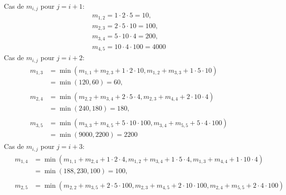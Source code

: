 {\begin{td-sol}[]
\begin{enumerate}
			Cas de \(m_{i, j}\) pour \(j = i + 1\):
			\begin{equation*}
				\begin{aligned}
					&m_{1, 2} = 1 \cdot 2 \cdot 5 = 10, \\
					&m_{2, 3} = 2 \cdot 5 \cdot 10 = 100,\\
					&m_{3, 4} = 5 \cdot 10 \cdot 4 = 200, \\
					&m_{4, 5} = 10 \cdot 4 \cdot 100 = 4000
				\end{aligned}
			\end{equation*}
			Cas de \(m_{i, j}\) pour \(j = i + 2\):
			\begin{equation*}
				\begin{aligned}
					&\begin{aligned}
						m_{1, 3} &= \min( m_{1, 1} + m_{2, 3} + 1 \cdot 2 \cdot 10, m_{1, 2} + m_{3, 3} + 1 \cdot 5 \cdot 10 ) \\
						&= \min(120, 60) = 60,
					\end{aligned}\\
					&\begin{aligned}
						m_{2, 4} &= \min( m_{2, 2} + m_{3, 4} + 2 \cdot 5 \cdot 4, m_{2, 3} + m_{4, 4} + 2 \cdot 10 \cdot 4 ) \\
						&= \min(240, 180) = 180,
					\end{aligned}\\
					&\begin{aligned}
						m_{3, 5} &= \min( m_{3, 3} + m_{4, 5} + 5 \cdot 10 \cdot 100, m_{3, 4} + m_{5, 5} + 5 \cdot 4 \cdot 100 ) \\
						&= \min(9000, 2200) = 2200
					\end{aligned}
				\end{aligned}
			\end{equation*}
			Cas de \(m_{i, j}\) pour \(j = i + 3\):
			\begin{equation*}
				\begin{aligned}
					&\begin{aligned}
						m_{1, 4} 
						&= \min( m_{1, 1} + m_{2, 4} + 1 \cdot 2 \cdot 4, m_{1, 2} + m_{3, 4} + 1 \cdot 5 \cdot 4, m_{1, 3} + m_{4, 4} + 1 \cdot 10 \cdot 4 ) \\
						&= \min(188, 230, 100) = 100,
					\end{aligned}\\
					&\begin{aligned}
						m_{2, 5} 
						&= \min( m_{2, 2} + m_{3, 5} + 2 \cdot 5 \cdot 100, m_{2, 3} + m_{4, 5} + 2 \cdot 10 \cdot 100, m_{2, 4} + m_{5, 5} + 2 \cdot 4 \cdot 100 ) \\

\end{aligned}
\end{aligned}
\end{equation*}
\end{enumerate}
\end{td-sol}}
